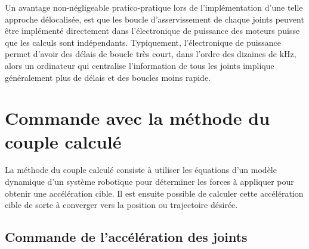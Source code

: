 Un avantage non-négligeable pratico-pratique lors de l'implémentation d'une telle approche délocalisée, est que les boucle d'asservissement de chaque joints peuvent être implémenté directement dans l'électronique de puissance des moteurs puisse que les calculs sont indépendants. Typiquement, l'électronique de puissance permet d'avoir des délais de boucle très court, dans l'ordre des dizaines de kHz, alors un ordinateur qui centralise l'information de tous les joints implique généralement plus de délais et des boucles moins rapide. 


\newpage
\section{Commande avec la méthode du couple calculé}

La méthode du couple calculé consiste à utiliser les équations d'un modèle dynamique d'un système robotique pour déterminer les forces à appliquer pour obtenir une accélération cible. Il est ensuite possible de calculer cette accélération cible de sorte à converger vers la position ou trajectoire désirée.





\subsection{Commande de l'accélération des joints}

